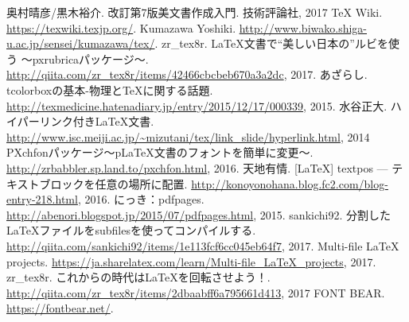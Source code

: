 
\begin{thebibliography}{99}
	奥村晴彦/黒木裕介.
	改訂第7版{\LaTeXe}美文書作成入門.
	技術評論社, 2017
	{\TeX} Wiki.
	\href{https://texwiki.texjp.org/}{https://texwiki.texjp.org/}.
	Kumazawa Yoshiki.
	\href{http://www.biwako.shiga-u.ac.jp/sensei/kumazawa/tex/}{http://www.biwako.shiga-u.ac.jp/sensei/kumazawa/tex/}.
	zr{\_}tex8r.
	LaTeX文書で“美しい日本の”ルビを使う ～pxrubricaパッケージ～.
	\href{http://qiita.com/zr_tex8r/items/42466cbcbeb670a3a2dc}{\url{http://qiita.com/zr_tex8r/items/42466cbcbeb670a3a2dc}}, 2017.
	あざらし.
	tcolorboxの基本-物理とTeXに関する話題.
	\href{http://texmedicine.hatenadiary.jp/entry/2015/12/17/000339}{http://texmedicine.hatenadiary.jp/entry/2015/12/17/000339}, 2015.
	水谷正大.
	ハイパーリンク付きLaTeX文書.
	\href{http://www.isc.meiji.ac.jp/~mizutani/tex/link_slide/hyperlink.html}{\url{http://www.isc.meiji.ac.jp/~mizutani/tex/link_slide/hyperlink.html}}, 2014
	PXchfonパッケージ～pLaTeX文書のフォントを簡単に変更～.
	\href{http://zrbabbler.sp.land.to/pxchfon.html}{http://zrbabbler.sp.land.to/pxchfon.html}, 2016.
	天地有情.
	[LaTeX] textpos --- テキストブロックを任意の場所に配置.
	\href{http://konoyonohana.blog.fc2.com/blog-entry-218.html}{http://konoyonohana.blog.fc2.com/blog-entry-218.html}, 2016.
	にっき：pdfpages.
	\href{http://abenori.blogspot.jp/2015/07/pdfpages.html}{http://abenori.blogspot.jp/2015/07/pdfpages.html}, 2015.
	sankichi92.
	分割したLaTeXファイルをsubfilesを使ってコンパイルする.
	\href{http://qiita.com/sankichi92/items/1e113fcf6cc045eb64f7}{http://qiita.com/sankichi92/items/1e113fcf6cc045eb64f7}, 2017.
	Multi-file LaTeX projects.
	\href{https://ja.sharelatex.com/learn/Multi-file_LaTeX_projects}{\url{https://ja.sharelatex.com/learn/Multi-file_LaTeX_projects}}, 2017.
	zr{\_}tex8r.
	これからの時代はLaTeXを回転させよう！.
	\href{http://qiita.com/zr_tex8r/items/2dbaabff6a795661d413}{\url{http://qiita.com/zr_tex8r/items/2dbaabff6a795661d413}}, 2017
	FONT BEAR.
	\href{https://fontbear.net/}{https://fontbear.net/}.
\end{thebibliography}

